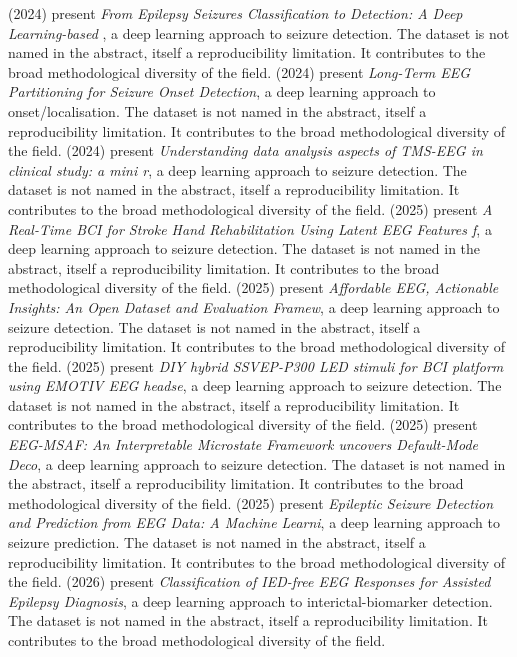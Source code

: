 \citet{ep241003385} (2024) present \emph{From Epilepsy Seizures Classification to Detection: A Deep Learning-based }, a deep learning approach to seizure detection. The dataset is not named in the abstract, itself a reproducibility limitation. It contributes to the broad methodological diversity of the field.
\citet{ep241215598} (2024) present \emph{Long-Term EEG Partitioning for Seizure Onset Detection}, a deep learning approach to onset/localisation. The dataset is not named in the abstract, itself a reproducibility limitation. It contributes to the broad methodological diversity of the field.
\citet{ep240309707} (2024) present \emph{Understanding data analysis aspects of TMS-EEG in clinical study: a mini r}, a deep learning approach to seizure detection. The dataset is not named in the abstract, itself a reproducibility limitation. It contributes to the broad methodological diversity of the field.
\citet{ep251015890} (2025) present \emph{A Real-Time BCI for Stroke Hand Rehabilitation Using Latent EEG Features f}, a deep learning approach to seizure detection. The dataset is not named in the abstract, itself a reproducibility limitation. It contributes to the broad methodological diversity of the field.
\citet{ep251101879} (2025) present \emph{Affordable EEG, Actionable Insights: An Open Dataset and Evaluation Framew}, a deep learning approach to seizure detection. The dataset is not named in the abstract, itself a reproducibility limitation. It contributes to the broad methodological diversity of the field.
\citet{ep250801510} (2025) present \emph{DIY hybrid SSVEP-P300 LED stimuli for BCI platform using EMOTIV EEG headse}, a deep learning approach to seizure detection. The dataset is not named in the abstract, itself a reproducibility limitation. It contributes to the broad methodological diversity of the field.
\citet{ep250902568} (2025) present \emph{EEG-MSAF: An Interpretable Microstate Framework uncovers Default-Mode Deco}, a deep learning approach to seizure detection. The dataset is not named in the abstract, itself a reproducibility limitation. It contributes to the broad methodological diversity of the field.
\citet{ep251024986} (2025) present \emph{Epileptic Seizure Detection and Prediction from EEG Data: A Machine Learni}, a deep learning approach to seizure prediction. The dataset is not named in the abstract, itself a reproducibility limitation. It contributes to the broad methodological diversity of the field.
\citet{ep260522858} (2026) present \emph{Classification of IED-free EEG Responses for Assisted Epilepsy Diagnosis}, a deep learning approach to interictal-biomarker detection. The dataset is not named in the abstract, itself a reproducibility limitation. It contributes to the broad methodological diversity of the field.
